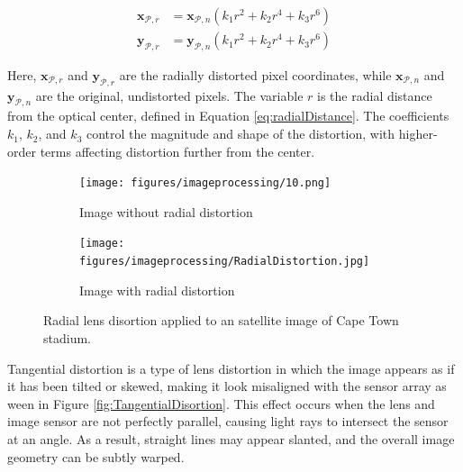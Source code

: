 \begin{equation}
    \begin{split}
    \mathbf{x}_{\mathcal{P},r}  &= \mathbf{x}_{\mathcal{P},n}(k_1r^2 + k_2r^4 + k_3r^6) \\
    \mathbf{y}_{\mathcal{P},r}  &= \mathbf{y}_{\mathcal{P},n} (k_1r^2 + k_2r^4 + k_3r^6)
    \end{split}
\end{equation}

\noindent
Here, $\mathbf{x}_{\mathcal{P},r}$ and $\mathbf{y}_{\mathcal{P},r}$ are the radially distorted pixel coordinates, while $\mathbf{x}_{\mathcal{P},n}$ and $\mathbf{y}_{\mathcal{P},n}$ are the original, undistorted pixels. 
The variable $r$ is the radial distance from the optical center, defined in Equation \ref{eq:radialDistance}. 
The coefficients $k_1$, $k_2$, and $k_3$ control the magnitude and shape of the distortion, with higher-order terms affecting distortion further from the center.

\begin{figure}[H]
    \centering
    \begin{subfigure}[b]{0.48\linewidth}
        \centering
        \texttt{[image: figures/imageprocessing/10.png]}
        \caption{Image without radial distortion}
        \label{fig:RD1}
    \end{subfigure}
    \hfill
    \begin{subfigure}[b]{0.48\linewidth}
        \centering
        \texttt{[image: figures/imageprocessing/RadialDistortion.jpg]}
        \caption{Image with radial distortion}
        \label{fig:Radial2}
    \end{subfigure}
    \caption{Radial lens disortion applied to an satellite image of Cape Town stadium.}
    \label{fig:RadialDisortion}
\end{figure}


Tangential distortion is a type of lens distortion in which the image appears as if it has been tilted or skewed, making it look misaligned with the 
sensor array as ween in Figure \ref{fig:TangentialDisortion}. This effect occurs when the lens and image sensor are not perfectly parallel, causing light rays to intersect the sensor at an angle. As a 
result, straight lines may appear slanted, and the overall image geometry can be subtly warped.

